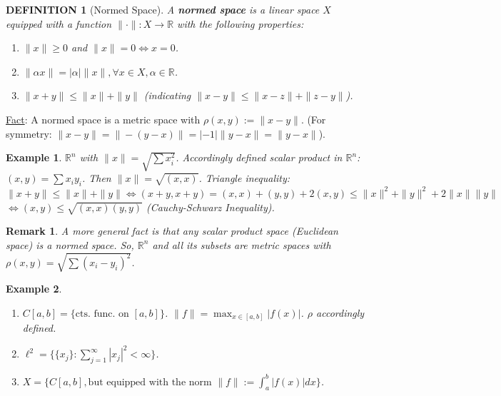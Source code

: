 \documentclass[12pt]{article}
\theoremstyle{blueplain}
\theoremstyle{bluedef}
\newtheorem{definition}{DEFINITION}[section]
\theoremstyle{blueremark}
\newtheorem{remark}{Remark}[section]
\newtheorem{example}{Example}[section]
\newcommand{\R}{\mathbb{R}}
\numberwithin{equation}{section}
\begin{document}
      \begin{definition}[Normed Space]
        A \textbf{normed space} is a linear space $X$ equipped with a function $\|\cdot\|: X \to \R$ with the following properties:
        \begin{enumerate}
          \item $\|x\| \geq 0$ and $\|x\| = 0 \iff x = 0$.
          \item $\|\alpha x\| = |\alpha| \|x\|, \forall x \in X, \alpha \in \R$.
          \item $\|x + y\| \leq \|x\| + \|y\|$ (indicating $\|x - y\| \leq \|x - z\| + \|z - y\|$).
        \end{enumerate}
      \end{definition}

      \underline{Fact}:
      A normed space is a metric space with $\rho(x, y) := \|x - y\|$.
      (For symmetry: $\|x - y\| = \|-(y - x)\| = |-1|\|y - x\| = \|y - x\|$).


      \begin{example}
        $\R^n$ with $\|x\| = \sqrt{\sum x_i^2}$.
        Accordingly defined scalar product in $\R^n$: $(x, y) = \sum x_i y_i$.
        Then $\|x\| = \sqrt{(x, x)}$.
        Triangle inequality: $\|x + y\| \leq \|x\| + \|y\| \iff (x+y, x+y) = (x, x) + (y, y) + 2(x, y) \leq \|x\|^2 + \|y\|^2 + 2\|x\|\|y\|$
        $\iff (x, y) \leq \sqrt{(x, x)(y, y)}$ (Cauchy-Schwarz Inequality).
      \end{example}

      \begin{remark}
        A more general fact is that any scalar product space (Euclidean space) is a normed space.
        So, $\R^n$ and all its subsets are metric spaces with
        $\rho(x, y) = \sqrt{\sum (x_i - y_i)^2}$.
      \end{remark}

      \begin{example}
        \begin{enumerate}
          \item $C[a, b] = \{ \text{cts. func. on } [a, b] \}$. $\|f\| = \max_{x \in [a, b]} |f(x)|$. $\rho$ accordingly defined.
          \item $\ell^2 = \{ \{x_j\} : \sum_{j=1}^\infty |x_j|^2 < \infty \}$.
          \item $X = \{ C[a, b], \text{but equipped with the norm } \|f\| := \int_a^b |f(x)| dx \}$.
        \end{enumerate}
      \end{example}
\end{document}
